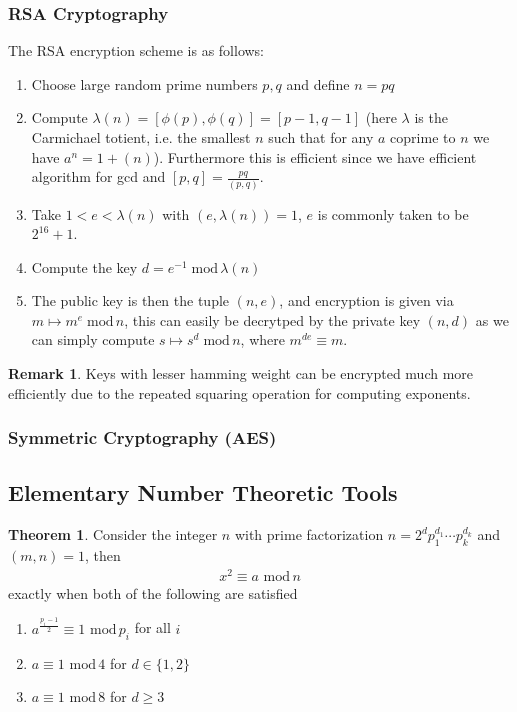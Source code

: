 \documentclass[11pt]{article}
\theoremstyle{definition}
\newtheorem{thm}{Theorem}
\newtheorem*{rmk}{Remark}
\newcommand{\set}[1]{\{#1\}}
\begin{document}
    \subsubsection{RSA Cryptography}
    The RSA encryption scheme is as follows:
    \begin{enumerate}
        \item Choose large random prime numbers \(p,q\) and define \(n = pq\)
        \item Compute \(\lambda(n) = [\phi(p),\phi(q)] = [p-1,q-1]\) (here \(\lambda\) is the Carmichael totient, i.e. the smallest \(n\) such that for any \(a\) coprime to \(n\) we have \(a^n = 1 + (n)\)). Furthermore this is efficient since we have efficient algorithm for gcd and \([p,q] = \frac{pq}{(p,q)}\).
        \item Take \(1 < e < \lambda(n)\) with \((e,\lambda(n)) = 1\), \(e\) is commonly taken to be \(2^{16} + 1\).
        \item Compute the key \(d = e^{-1}\; \text{mod}\,\lambda(n)\)
        \item The public key is then the tuple \((n,e)\), and encryption is given via \(m \mapsto m^e\;\text{mod}\,n\), this can easily be decrytped by the private key \((n,d)\) as we can simply compute \(s \mapsto s^d \;\text{mod}\,n\), where \(m^{de} \equiv m\).
    \end{enumerate}
    \begin{rmk}
        Keys with lesser hamming weight can be encrypted much more efficiently due to the repeated squaring operation for computing exponents.
    \end{rmk}

    \subsubsection{Symmetric Cryptography (AES)}
    \subsection{Elementary Number Theoretic Tools}
    \begin{thm}
        Consider the integer \(n\) with prime factorization \(n = 2^dp_1^{d_1}\cdots p_k^{d_k}\) and \((m,n) = 1\), then
        \begin{align*}
            x^2 \equiv a \text{ mod}\,n
        \end{align*}
        exactly when both of the following are satisfied
        \begin{enumerate}
            \item \(a^{\frac{p_i - 1}{2}} \equiv 1 \text{ mod}\,p_i\) for all \(i\)
            \item \(a \equiv 1 \text{ mod}\,4\) for \(d \in \set{1,2}\)
            \item \(a \equiv 1 \text{ mod}\,8\) for \(d \geq 3\)
        \end{enumerate}
    \end{thm}
\end{document}
